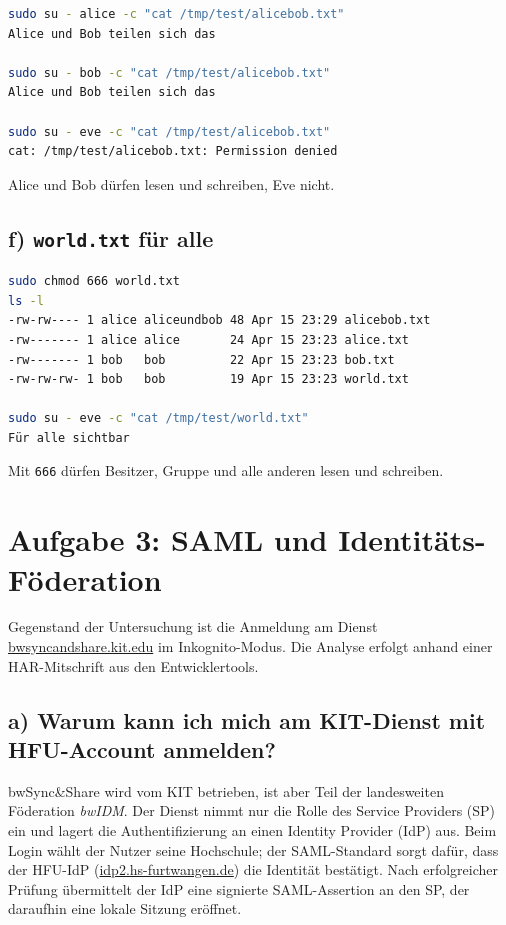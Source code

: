 \documentclass[
	fontsize=12pt,
	paper=a4,
	numbers=noenddot,
	listof=totoc,
	listof=entryprefix,
	listof=nochaptergap,
	bibliography=totoc,
	parskip=half,
	openany
]{scrbook}
\begin{document}
\begin{lstlisting}[language=bash]
sudo su - alice -c "cat /tmp/test/alicebob.txt"
Alice und Bob teilen sich das

sudo su - bob -c "cat /tmp/test/alicebob.txt"
Alice und Bob teilen sich das

sudo su - eve -c "cat /tmp/test/alicebob.txt"
cat: /tmp/test/alicebob.txt: Permission denied
\end{lstlisting}

Alice und Bob dürfen lesen und schreiben, Eve nicht.

\section*{f) \texttt{world.txt} für alle}

\begin{lstlisting}[language=bash]
sudo chmod 666 world.txt
ls -l
-rw-rw---- 1 alice aliceundbob 48 Apr 15 23:29 alicebob.txt
-rw------- 1 alice alice       24 Apr 15 23:23 alice.txt
-rw------- 1 bob   bob         22 Apr 15 23:23 bob.txt
-rw-rw-rw- 1 bob   bob         19 Apr 15 23:23 world.txt

sudo su - eve -c "cat /tmp/test/world.txt"
Für alle sichtbar
\end{lstlisting}

Mit \texttt{666} dürfen Besitzer, Gruppe und alle anderen lesen und schreiben.


\chapter*{Aufgabe 3: SAML und Identitäts-Föderation}

Gegenstand der Untersuchung ist die Anmeldung am Dienst \url{bwsyncandshare.kit.edu} im Inkognito-Modus.
Die Analyse erfolgt anhand einer HAR-Mitschrift aus den Entwicklertools.

\section*{a) Warum kann ich mich am KIT-Dienst mit HFU-Account anmelden?}

bwSync\&Share wird vom KIT betrieben, ist aber Teil der landesweiten Föderation \emph{bwIDM}.
Der Dienst nimmt nur die Rolle des Service Providers (SP) ein und lagert die Authentifizierung an einen Identity Provider (IdP) aus.
Beim Login wählt der Nutzer seine Hochschule; der SAML-Standard sorgt dafür, dass der HFU-IdP (\url{idp2.hs-furtwangen.de}) die Identität bestätigt.
Nach erfolgreicher Prüfung übermittelt der IdP eine signierte SAML-Assertion an den SP, der daraufhin eine lokale Sitzung eröffnet.
\end{document}
